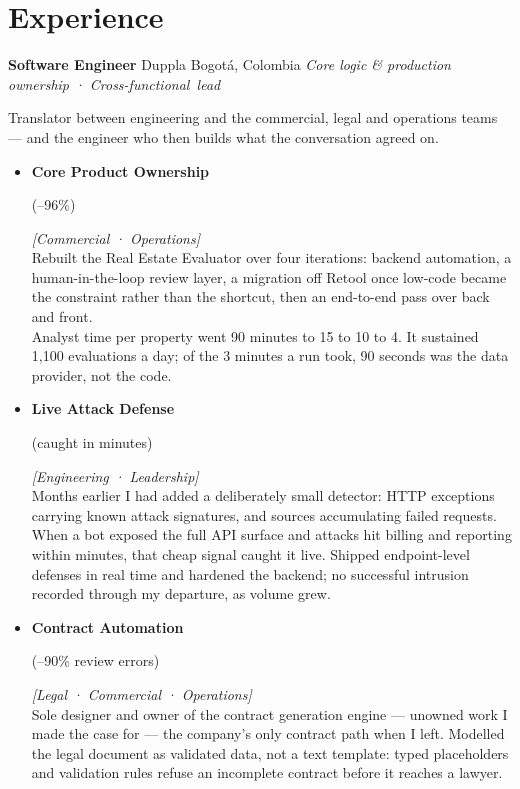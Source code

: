 \documentclass[11pt,a4paper,sans]{moderncv}
\newcommand{\impact}[1]{{\color{slate}\small #1}}
\newcommand{\impactnext}[1]{\\[0.4em]\impact{#1}}
\newcommand{\metric}[1]{%
  \begingroup
  \setlength{\fboxsep}{2pt}%
  \colorbox{whisper}{\color{navy}\bfseries\strut #1}%
  \endgroup
}
\newcommand{\stakeholders}[1]{{\color{azure}\footnotesize\textsf{\textit{[#1]}}}}
\newcommand{\rolebold}[1]{{\color{navy}\bfseries #1}}
\newcommand{\softrule}{%
  \vspace{0.45em}
  \noindent\hspace{0pt}{\color{navy}\rule{6pt}{2pt}}{\color{softgray!40}\rule[0.5pt]{0.92\linewidth}{0.4pt}}\hspace{0pt}%
  \vspace{0.35em}
}
\begin{document}
\softrule

\section{Experience}
\nopagebreak

%
  {\textbf{Software Engineer}}%
  {Duppla}%
  {Bogotá, Colombia}%
  {\textit{Core logic \& production ownership · \mbox{Cross-functional lead}}}{%
  Translator between engineering and the commercial, legal and operations teams --- and the engineer who then builds what the conversation agreed on.
  \begin{itemize}
    \item \rolebold{Core Product Ownership} \metric{(--96\%)} \stakeholders{Commercial · Operations}\\
      \impact{Rebuilt the Real Estate Evaluator over four iterations: backend automation, a human-in-the-loop review layer, a migration off Retool once low-code became the constraint rather than the shortcut, then an end-to-end pass over back and front.}
      \impactnext{Analyst time per property went 90 minutes to 15 to 10 to 4. It sustained 1,100 evaluations a day; of the 3 minutes a run took, 90 seconds was the data provider, not the code.}
    \item \rolebold{Live Attack Defense} \metric{(caught in minutes)} \stakeholders{Engineering · Leadership}\\
      \impact{Months earlier I had added a deliberately small detector: HTTP exceptions carrying known attack signatures, and sources accumulating failed requests.}
      \impactnext{When a bot exposed the full API surface and attacks hit billing and reporting within minutes, that cheap signal caught it live. Shipped endpoint-level defenses in real time and hardened the backend; no successful intrusion recorded through my departure, as volume grew.}
    \item \rolebold{Contract Automation} \metric{(--90\% review errors)} \stakeholders{Legal · Commercial · Operations}\\
      \impact{Sole designer and owner of the contract generation engine --- unowned work I made the case for --- the company's only contract path when I left. Modelled the legal document as validated data, not a text template: typed placeholders and validation rules refuse an incomplete contract before it reaches a lawyer.}

\end{itemize}}
\end{document}
